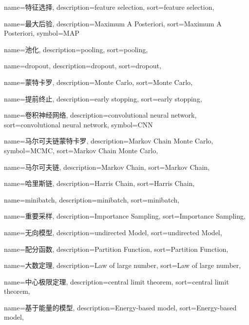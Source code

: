 {
  name=特征选择,
  description={feature selection},
  sort={feature selection},
}

{
  name=最大后验,
  description={Maximum A Posteriori},
  sort={Maximum A Posteriori},
  symbol={MAP}
}

{
  name=池化,
  description={pooling},
  sort={pooling},
}

{
  name=dropout,
  description={dropout},
  sort={dropout},
}

{
  name=蒙特卡罗,
  description={Monte Carlo},
  sort={Monte Carlo},
}

{
  name=提前终止,
  description={early stopping},
  sort={early stopping},
}

{
  name=卷积神经网络,
  description={convolutional neural network},
  sort={convolutional neural network},
  symbol={CNN}
}

{
  name=马尔可夫链蒙特卡罗,
  description={Markov Chain Monte Carlo},
  symbol={MCMC},
  sort={Markov Chain Monte Carlo},
}

{
  name=马尔可夫链,
  description={Markov Chain},
  sort={Markov Chain},
}

{
  name=哈里斯链,
  description={Harris Chain},
  sort={Harris Chain},
}

{
  name=minibatch,
  description={minibatch},
  sort={minibatch},
}

{
  name=重要采样,
  description={Importance Sampling},
  sort={Importance Sampling},
}

{
  name=无向模型,
  description={undirected Model},
  sort={undirected Model},
}

{
  name=配分函数,
  description={Partition Function},
  sort={Partition Function},
}

{
  name=大数定理,
  description={Law of large number},
  sort={Law of large number},
}

{
  name=中心极限定理,
  description={central limit theorem},
  sort={central limit theorem},
}

{
  name=基于能量的模型,
  description={Energy-based model},
  sort={Energy-based model},
}

